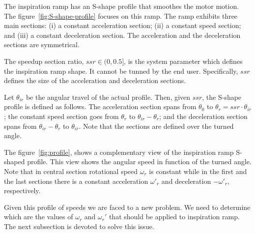 \documentclass[a4paper]{article}
\begin{document}
The inspiration ramp has an S-shape profile that smoothes the motor
motion. The figure~\ref{fig:S-shape-profile} focuses on this ramp. The
ramp exhibits three main sections: (i) a constant acceleration
section; (ii) a constant speed section; and (iii) a constant
deceleration section. The acceleration and the deceleration sections
are symmetrical.

The speedup section ratio, $\mathit{ssr}\in(0,0.5]$, is the system
parameter which defines the inspiration ramp shape. It cannot be
tunned by the end user.
%
Specifically, $\mathit{ssr}$ defines the size of the acceleration and
deceleration sections.

Let $\theta_{ir}$ be the angular travel of the actual profile. Then,
given $\mathit{ssr}$, the S-shape profile is defined as follows. The
acceleration section spans from $\theta_0$ to
$\theta_r=\mathit{ssr}\cdot\theta_{ir}$; the constant speed section
goes from $\theta_r$ to $\theta_{ir}-\theta_r$; and the deceleration
section spans from $\theta_{ir}-\theta_r$ to $\theta_{ir}$. Note that
the sections are defined over the turned angle.

The figure~\ref{fig:profile}, shows a complementary view of the
inspiration ramp S-shaped profile. This view shows the angular speed
in function of the turned angle. Note that in central section
rotational speed $\omega_r$ is constant while in the first and the
last sections there is a constant acceleration $\omega'_r$ and
deceleration $-\omega'_r$, respectively.

Given this profile of speeds we are faced to a new problem. We need to
determine which are the values of $\omega_r$ and $\omega_r'$ that
should be applied to inspiration ramp. The next subsection is devoted
to solve this issue.
\end{document}

